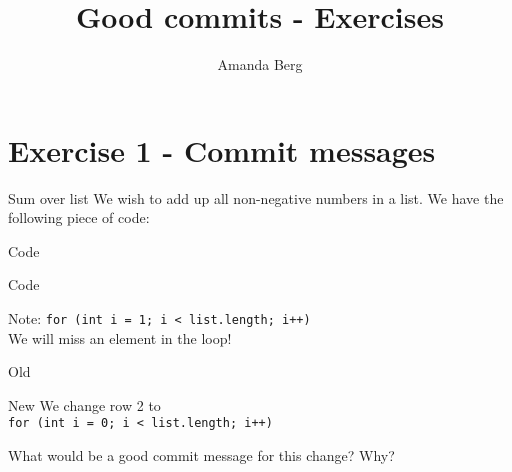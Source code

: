 \title{%
  Good commits - Exercises
}
\author{Amanda Berg}


\mode*


\section{Exercise 1 - Commit messages}
\begin{frame}
\begin{block}{Sum over list}
    We wish to add up all non-negative numbers in a list. We have the following piece of code:
\end{block}
\begin{block}{Code}
    
\end{block}
\end{frame}

\begin{frame}
\begin{block}{Code}
    
\end{block}

\begin{alertblock}{Note:}
    \lstinline{for (int i = 1; i < list.length; i++)}\\
    We will miss an element in the loop!
\end{alertblock}
\end{frame}


\begin{frame}
\begin{block}{Old}
    
\end{block}

\begin{block}{New}
    We change row 2 to \\
    \lstinline{for (int i = 0; i < list.length; i++)}
\end{block}
\end{frame}

\begin{frame}
\begin{question}
What would be a good commit message for this change? Why? %
\end{question}    
\end{frame}

